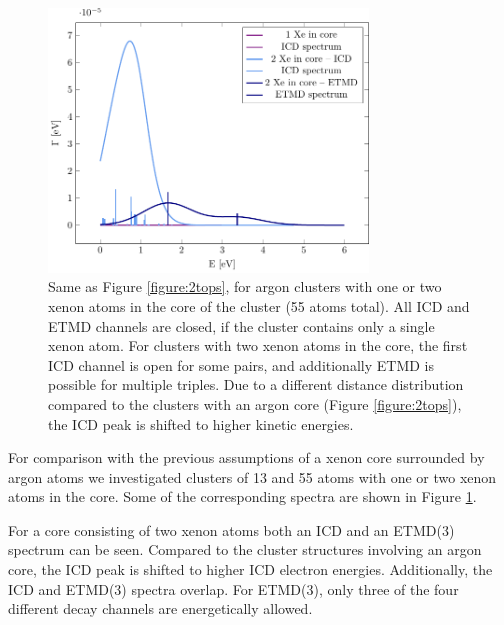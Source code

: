 \begin{figure}[ht]
 \centering
 \includegraphics[width=8.5cm]{pics/xe_3_in.pdf}
 \caption{Same as Figure \protect\ref{figure:2tops}, for argon clusters with
          one or two xenon atoms in the core of the cluster (55 atoms total). 
          All ICD and ETMD channels are closed, if the cluster contains only 
          a single xenon atom. For clusters with two xenon atoms
          in the core, the first ICD channel is open for some pairs,
          and additionally ETMD is possible for multiple triples. Due to a
          different distance distribution compared to the clusters with an argon
          core (Figure \protect\ref{figure:2tops}), 
          the ICD peak is shifted to higher kinetic energies.}
 \label{figure:xe_3_in}
\end{figure}
%
For comparison with the previous assumptions of a xenon core surrounded
by argon atoms we investigated clusters of 13 and 55 atoms with one or two
xenon atoms in the core. Some of the corresponding
spectra are shown in Figure \ref{figure:xe_3_in}.

For a core consisting of two xenon atoms both an ICD and an ETMD(3) spectrum
can be seen. Compared to the cluster structures involving an argon core, the ICD peak is
shifted to higher ICD electron energies. 
Additionally, the ICD and ETMD(3) spectra overlap.
For ETMD(3), only three of the four different decay channels are
energetically allowed.

